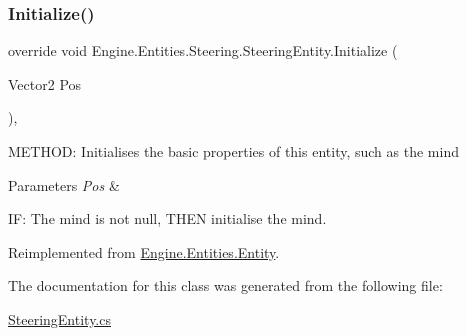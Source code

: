 \subsubsection{\texorpdfstring{Initialize()}{Initialize()}}
{\footnotesize\ttfamily override void Engine.\+Entities.\+Steering.\+Steering\+Entity.\+Initialize (\begin{DoxyParamCaption}\item[{Vector2}]{Pos }\end{DoxyParamCaption})\hspace{0.3cm}{\ttfamily [inline]}, {\ttfamily [virtual]}}



M\+E\+T\+H\+OD\+: Initialises the basic properties of this entity, such as the mind 


\begin{DoxyParams}{Parameters}
{\em Pos} & \\
\hline
\end{DoxyParams}
IF\+: The mind is not null, T\+H\+EN initialise the mind. 

Reimplemented from \hyperlink{a00314_aa1425aeeac379c5141e7560b84850b3d}{Engine.\+Entities.\+Entity}.



The documentation for this class was generated from the following file\+:\begin{DoxyCompactItemize}
\item 
\hyperlink{a00038}{Steering\+Entity.\+cs}\end{DoxyCompactItemize}
